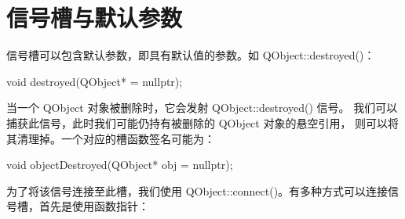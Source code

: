 \section{信号槽与默认参数}

信号槽可以包含默认参数，即具有默认值的参数。如 QObject::destroyed()：

\begin{cppcode}
void destroyed(QObject* = nullptr);
\end{cppcode}

当一个 QObject 对象被删除时，它会发射 QObject::destroyed() 信号。
我们可以捕获此信号，此时我们可能仍持有被删除的 QObject 对象的悬空引用，
则可以将其清理掉。一个对应的槽函数签名可能为：

\begin{cppcode}
void objectDestroyed(QObject* obj = nullptr);
\end{cppcode}

为了将该信号连接至此槽，我们使用 QObject::connect()。有多种方式可以连接信号槽，首先是使用函数指针：